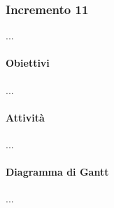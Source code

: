\subsubsection{Incremento 11}
...
\paragraph{Obiettivi}
...
\paragraph{Attività}
...
\paragraph{Diagramma di Gantt}
...

